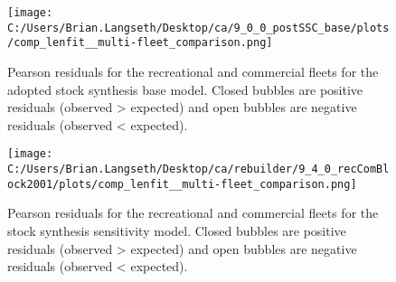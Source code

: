 \documentclass[11pt,
  english,
  a4paper,
]{article}
\begin{document}
\tagmcend\tagstructend


\begin{figure}
\centering
\texttt{[image: C:/Users/Brian.Langseth/Desktop/ca/9\_0\_0\_postSSC\_base/plots/comp\_lenfit\_\_multi-fleet\_comparison.png]}
\caption{Pearson residuals for the recreational and commercial fleets for the adopted stock synthesis base model. Closed bubbles are positive residuals (observed \textgreater{} expected) and open bubbles are negative residuals (observed \textless{} expected).\label{fig:Pearson-base}}
\end{figure}

\tagmcend\tagstructend


\begin{figure}
\centering
\texttt{[image: C:/Users/Brian.Langseth/Desktop/ca/rebuilder/9\_4\_0\_recComBlock2001/plots/comp\_lenfit\_\_multi-fleet\_comparison.png]}
\caption{Pearson residuals for the recreational and commercial fleets for the stock synthesis sensitivity model. Closed bubbles are positive residuals (observed \textgreater{} expected) and open bubbles are negative residuals (observed \textless{} expected).\label{fig:Pearson-sens}}
\end{figure}

\tagmcend\tagstructend
\end{document}
